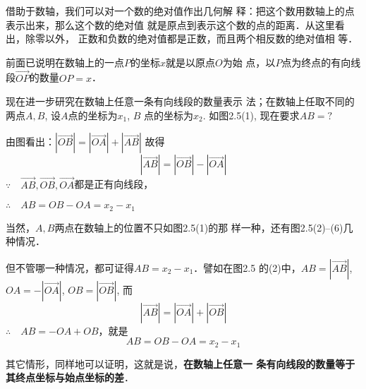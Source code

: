 借助于数轴，我们可以对一个数的绝对值作出几何解
释：把这个数用数轴上的点表示出来，那么这个数的绝对值
就是原点到表示这个数的点的距离．从这里看出，除零以外，
正数和负数的绝对值都是正数，而且两个相反数的绝对值相
等．

前面已说明在数轴上的一点$P$的坐标$x$就是以原点$O$为始
点，以$P$点为终点的有向线段$\Vec{OP}$的数量$OP=x$．

现在进一步研究在数轴上任意一条有向线段的数量表示
法；在数轴上任取不同的两点$A,B$, 设$A$点的坐标为$x_1$, $B$
点的坐标为$x_2$. 如图2.5(1), 现在要求$AB=?$

由图看出：$|\Vec{OB}|=|\Vec{OA}|+|\Vec{AB}|$
故得
\[|\Vec{AB}|=|\Vec{OB}|-|\Vec{OA}|\]
$\because\quad \Vec{AB}, \Vec{OB}, \Vec{OA}$都是正有向线段，

$\therefore\quad AB=OB-OA=x_2-x_1$

当然，$A,B$两点在数轴上的位置不只如图2.5(1)的那
样一种，还有图2.5(2)--(6)几种情况．

\begin{figure}[htp]
    \centering
    \caption{}
\end{figure}



但不管哪一种情况，都可证得$AB=x_2-x_1$．譬如在图2.5
的(2)中，$AB=|\Vec{AB}|$, $OA=-|\Vec{OA}|$, $OB=|\Vec{OB}|$, 而
\[|\Vec{AB}|=|\Vec{OA}|+|\Vec{OB}|\]
$\therefore\quad AB=-OA+OB$，就是
\[AB=OB-OA=x_2-x_1\]

其它情形，同样地可以证明，这就是说，\textbf{在数轴上任意一
条有向线段的数量等于其终点坐标与始点坐标的差}．

